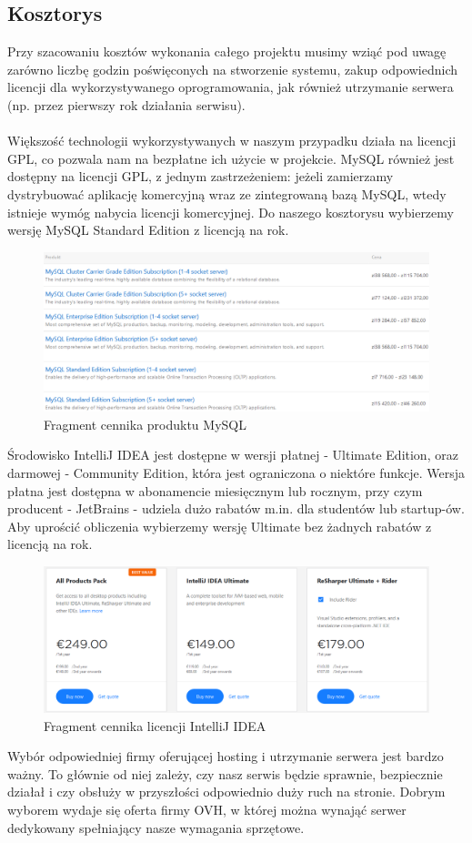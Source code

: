 \documentclass[12pt,a4paper,titlepage]{article}
\begin{document}
\subsection{Kosztorys}
Przy szacowaniu kosztów wykonania całego projektu musimy wziąć pod uwagę zarówno liczbę godzin poświęconych na stworzenie systemu, zakup odpowiednich licencji dla wykorzystywanego oprogramowania, jak również utrzymanie serwera (np. przez pierwszy rok działania serwisu). \\\\
Większość technologii wykorzystywanych w naszym przypadku działa na licencji GPL, co pozwala nam na bezpłatne ich użycie w projekcie. MySQL również jest dostępny na licencji GPL, z jednym zastrzeżeniem: jeżeli zamierzamy dystrybuować aplikację komercyjną wraz ze zintegrowaną bazą MySQL, wtedy istnieje wymóg nabycia licencji komercyjnej. Do naszego kosztorysu wybierzemy wersję MySQL Standard Edition z licencją na rok. 
\begin{figure}[H]
    \centering
    \includegraphics[width=13.5cm]{Pics/mysql1.png}
    \caption{Fragment cennika produktu MySQL}
    \label{fig:mysql1}
\end{figure}
\noindent
Środowisko IntelliJ IDEA jest dostępne w wersji płatnej - Ultimate Edition, oraz darmowej - Community Edition, która jest ograniczona o niektóre funkcje. Wersja płatna jest dostępna w abonamencie miesięcznym lub rocznym, przy czym producent - JetBrains - udziela dużo rabatów m.in. dla studentów lub startup-ów. Aby uprościć obliczenia wybierzemy wersję Ultimate bez żadnych rabatów z licencją na rok.
\begin{figure}[H]
    \centering
    \includegraphics[width=13.5cm]{Pics/intellij1.png}
    \caption{Fragment cennika licencji IntelliJ IDEA}
    \label{fig:intellij1}
\end{figure}
\noindent
Wybór odpowiedniej firmy oferującej hosting i utrzymanie serwera jest bardzo ważny. To głównie od niej zależy, czy nasz serwis będzie sprawnie, bezpiecznie działał i czy obsłuży w przyszłości odpowiednio duży ruch na stronie. Dobrym wyborem wydaje się oferta firmy OVH, w której można wynająć serwer dedykowany spełniający nasze wymagania sprzętowe.
\end{document}
